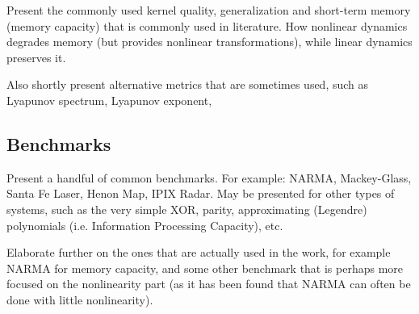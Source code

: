 Present the commonly used kernel quality, generalization and short-term memory
(memory capacity) that is commonly used in literature. How nonlinear dynamics
degrades memory (but provides nonlinear transformations), while linear dynamics
preserves it.

Also shortly present alternative metrics that are sometimes used, such as
Lyapunov spectrum, Lyapunov exponent,

\subsection{Benchmarks}

Present a handful of common benchmarks. For example: NARMA, Mackey-Glass, Santa
Fe Laser, Henon Map, IPIX Radar. May be presented for other types of systems,
such as the very simple XOR, parity, approximating (Legendre) polynomials
(i.e. Information Processing Capacity), etc.

Elaborate further on the ones that are actually used in the work, for example
NARMA for memory capacity, and some other benchmark that is perhaps more focused
on the nonlinearity part (as it has been found that NARMA can often be done with
little nonlinearity).

